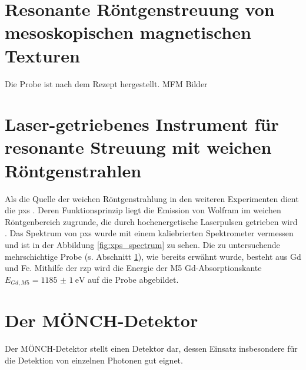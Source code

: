 
\section{Resonante Röntgenstreuung von mesoskopischen magnetischen Texturen}
\label{text:streuung_theorie}
Die Probe ist nach dem Rezept \cite{tripathi_dichroic_2011} hergestellt. MFM Bilder
\section{Laser-getriebenes Instrument für resonante Streuung mit weichen Röntgenstrahlen}
Als die Quelle der weichen Röntgenstrahlung in den weiteren Experimenten dient die \gls{pxs} \cite{schick_laser-driven_2021}. Deren Funktionsprinzip liegt die Emission von Wolfram im weichen Röntgenbereich zugrunde, die durch hochenergetische Laserpulsen getrieben wird \cite{mantouvalou_high_2015}. Das Spektrum von \gls{pxs} wurde mit einem kaliebrierten Spektrometer vermessen und ist in der Abbildung \ref{fig:xps_spectrum} zu sehen. Die zu untersuchende mehrschichtige Probe (s. Abschnitt \ref{text:streuung_theorie}), wie bereits erwähnt wurde, besteht aus Gd und Fe. Mithilfe der \gls{rzp} wird die Energie der M5 Gd-Absorptionskante $E_{Gd, M5} = \SI{1185(1)}{\eV}$ \cite[Abb. 6(a)]{prieto_x-ray_2005} auf die Probe abgebildet.

\section{Der MÖNCH-Detektor}
\label{text:moench_theorie}
Der MÖNCH-Detektor stellt einen Detektor dar, dessen Einsatz insbesondere für die Detektion von einzelnen Photonen gut eignet. \cite{bergamaschi_monch_2018}



